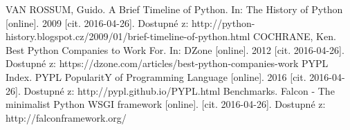 \begin{thebibliography}{1}

 VAN ROSSUM, Guido. A Brief Timeline of Python. In: The History of Python [online]. 2009 [cit. 2016-04-26]. Dostupné z: http://python-history.blogspot.cz/2009/01/brief-timeline-of-python.html
 COCHRANE, Ken. Best Python Companies to Work For. In: DZone [online]. 2012 [cit. 2016-04-26]. Dostupné z: https://dzone.com/articles/best-python-companies-work
 PYPL Index. PYPL PopularitY of Programming Language [online]. 2016 [cit. 2016-04-26]. Dostupné z: http://pypl.github.io/PYPL.html
 Benchmarks. Falcon - The minimalist Python WSGI framework [online]. [cit. 2016-04-26]. Dostupné z: http://falconframework.org/
\end{thebibliography}